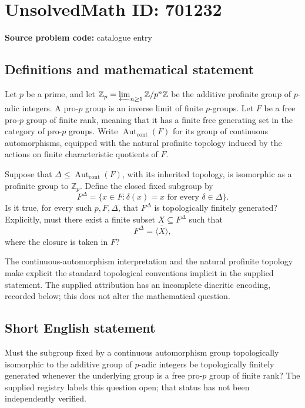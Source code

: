 \documentclass[11pt]{article}
\newcommand{\Z}{\mathbb{Z}}
\begin{document}
\section*{UnsolvedMath ID: 701232}
\textbf{Source problem code:} catalogue entry
\subsection{Definitions and mathematical statement}
Let \(p\) be a prime, and let \(\Z_p=\varprojlim_{n\geq 1}\Z/p^n\Z\) be the additive profinite group of \(p\)-adic integers. A pro-\(p\) group is an inverse limit of finite \(p\)-groups. Let \(F\) be a free pro-\(p\) group of finite rank, meaning that it has a finite free generating set in the category of pro-\(p\) groups. Write \(\operatorname{Aut}_{\mathrm{cont}}(F)\) for its group of continuous automorphisms, equipped with the natural profinite topology induced by the actions on finite characteristic quotients of \(F\).

Suppose that \(\Delta\leq\operatorname{Aut}_{\mathrm{cont}}(F)\), with its inherited topology, is isomorphic as a profinite group to \(\Z_p\). Define the closed fixed subgroup by
\[
F^\Delta=\{x\in F:\delta(x)=x\text{ for every }\delta\in\Delta\}.
\]
Is it true, for every such \(p,F,\Delta\), that \(F^\Delta\) is topologically finitely generated? Explicitly, must there exist a finite subset \(X\subseteq F^\Delta\) such that
\[
F^\Delta=\overline{\langle X\rangle},
\]
where the closure is taken in \(F\)?

The continuous-automorphism interpretation and the natural profinite topology make explicit the standard topological conventions implicit in the supplied statement. The supplied attribution has an incomplete diacritic encoding, recorded below; this does not alter the mathematical question.
\subsection{Short English statement}
Must the subgroup fixed by a continuous automorphism group topologically isomorphic to the additive group of \(p\)-adic integers be topologically finitely generated whenever the underlying group is a free pro-\(p\) group of finite rank? The supplied registry labels this question open; that status has not been independently verified.
\end{document}
